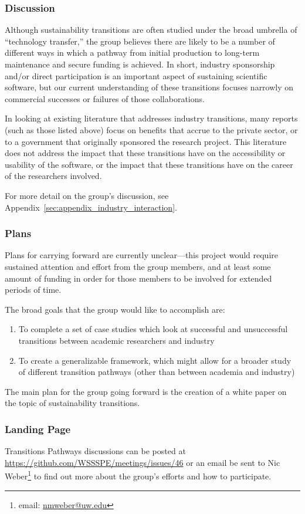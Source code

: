 \subsubsection{Discussion}

Although sustainability transitions are often studied under the broad umbrella
of ``technology transfer,'' the group believes there are likely to be a number of
different ways in which a pathway from initial production to long-term
maintenance and secure funding is achieved. In short, industry sponsorship
and/or direct participation is an important aspect of sustaining scientific
software, but our current understanding of these transitions focuses narrowly on
commercial successes or failures of those collaborations.

In looking at existing literature that addresses industry transitions, many
reports (such as those listed above) focus on benefits that accrue to the
private sector, or to a government that originally sponsored the research
project. This literature does not address the impact that these transitions have
on the accessibility or usability of the software, or the impact that these
transitions have on the career of the researchers involved.

For more detail on the group's discussion, see
Appendix~\ref{sec:appendix_industry_interaction}.

\subsubsection{Plans}

Plans for carrying forward are currently unclear---this project would require
sustained attention and effort from the group members, and at least some amount of
funding in order for those members to be involved for extended periods of time.

The broad goals that the group would like to accomplish are: 

\begin{enumerate}

\item To complete a set of case studies which look at successful and
unsuccessful transitions between academic researchers and industry

\item To create a generalizable framework, which might allow for a broader study
of different transition pathways (other than between academia and industry)

\end{enumerate}

The main plan for the group going forward is the creation of a white paper on
the topic of sustainability transitions.

\subsubsection{Landing Page}

Transitions Pathways discussions can be posted at
\url{https://github.com/WSSSPE/meetings/issues/46} or an email be sent to Nic
Weber\footnote{email: \href{mailto:nmweber@uw.edu}{nmweber@uw.edu}} to find out
more about the group's efforts and how to participate.
